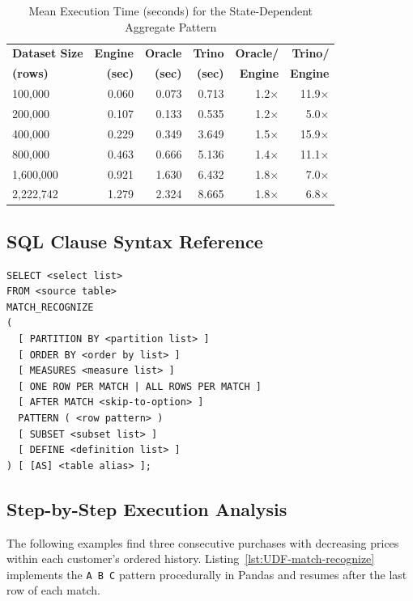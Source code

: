 \documentclass[preprint,12pt,times,a4paper]{elsarticle}
\begin{document}
\begin{table}[t]
\centering\small

\begin{tabular}{lrrrrr}
\toprule
\textbf{Dataset Size} & \textbf{Engine} & \textbf{Oracle} & \textbf{Trino} & \textbf{Oracle/} & \textbf{Trino/} \\
\textbf{(rows)} & \textbf{(sec)} & \textbf{(sec)} & \textbf{(sec)} & \textbf{Engine} & \textbf{Engine} \\
\midrule
100,000 & 0.060 & 0.073 & 0.713 & 1.2$\times$ & 11.9$\times$ \\
200,000 & 0.107 & 0.133 & 0.535 & 1.2$\times$ & 5.0$\times$ \\
400,000 & 0.229 & 0.349 & 3.649 & 1.5$\times$ & 15.9$\times$ \\
800,000 & 0.463 & 0.666 & 5.136 & 1.4$\times$ & 11.1$\times$ \\
1,600,000 & 0.921 & 1.630 & 6.432 & 1.8$\times$ & 7.0$\times$ \\
2,222,742 & 1.279 & 2.324 & 8.665 & 1.8$\times$ & 6.8$\times$ \\
\bottomrule
\end{tabular}
\caption{Mean Execution Time (seconds) for the State-Dependent Aggregate Pattern}
\label{tab:worstcase_coverage}
\end{table}

\subsection{SQL Clause Syntax Reference} \label{Full_SQL}
\begin{verbatim}
SELECT <select list>
FROM <source table>
MATCH_RECOGNIZE
(
  [ PARTITION BY <partition list> ]
  [ ORDER BY <order by list> ]
  [ MEASURES <measure list> ]
  [ ONE ROW PER MATCH | ALL ROWS PER MATCH ]
  [ AFTER MATCH <skip-to-option> ]
  PATTERN ( <row pattern> )
  [ SUBSET <subset list> ]
  [ DEFINE <definition list> ]
) [ [AS] <table alias> ];
\end{verbatim}

\subsection{Step-by-Step Execution Analysis}\label{Step-by-Step}

The following examples find three consecutive purchases with decreasing
prices within each customer's ordered history. Listing~\ref{lst:UDF-match-recognize}
implements the \texttt{A B C} pattern procedurally in Pandas and resumes after
the last row of each match.
\end{document}
